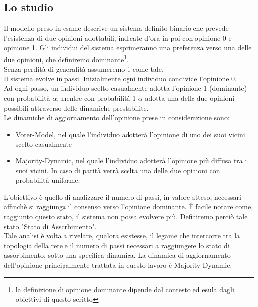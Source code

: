 \documentclass{article}
\begin{document}
\subsection{Lo studio}
Il modello preso in esame descrive un sistema definito binario che prevede l'esistenza di due opinioni adottabili, indicate d'ora in poi con opinione 0 e opinione 1. Gli individui del sistema esprimeranno una preferenza verso una delle due opinioni, che definiremo  dominante\footnote{la definizione di opinione dominante dipende dal contesto ed esula dagli obiettivi di questo scritto}.\\
Senza perdità di generalità assumeremo 1 come tale.\\
Il sistema evolve in passi. Inizialmente ogni individuo condivide l'opinione 0.\\
Ad ogni passo, un individuo scelto casualmente adotta l'opinione 1 (dominante) con probabilità $\alpha$, mentre con probabilità 1-$\alpha$ adotta una delle due opinioni possibili attraverso delle dinamiche prestabilite.\\
Le dinamiche di aggiornamento dell'opinione prese in considerazione sono:
\begin{itemize}
\item Voter-Model, nel quale l'individuo adotterà l'opinione di uno dei suoi vicini scelto casualmente
\item Majority-Dynamic, nel quale l'individuo adotterà l'opinione più diffusa tra i suoi vicini. In caso di parità verrà scelta una delle due opinioni con probabilità uniforme.
\end{itemize}
L'obiettivo è quello di analizzare il numero di passi, in valore atteso, necessari affinchè si raggiunga il consenso verso l'opinione dominante. È facile notare come, raggiunto questo stato, il sistema non possa evolvere più. Definiremo perciò tale stato "Stato di Assorbimento".\\
Tale analisi è volta a rivelare, qualora esistesse, il legame che intercorre tra la topologia della rete e il numero di passi necessari a raggiungere lo stato di assorbimento, sotto una specifica dinamica.
La dinamica di aggiornamento dell'opinione principalmente trattata in questo lavoro è Majority-Dynamic.
\end{document}
